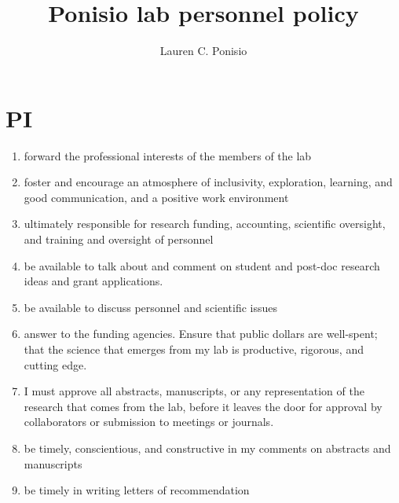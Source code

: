 \documentclass[12pt]{article}
\title{Ponisio lab personnel policy}
\author{Lauren C. Ponisio}
\begin{document}
\maketitle

\section{PI}
\begin{enumerate} 
\item forward the professional interests of the members of the lab
\item foster and encourage an atmosphere of inclusivity, exploration,
  learning, and good communication, and a positive work environment
\item ultimately responsible for research funding, accounting,
  scientific oversight, and training and oversight of personnel
\item be available to talk about and comment on student and post-doc
  research ideas and grant applications.
\item be available to discuss personnel and scientific issues 
\item answer to the funding agencies. Ensure that public dollars are
  well-spent; that the science that emerges from my lab is productive,
  rigorous, and cutting edge. 
\item I must approve all abstracts, manuscripts, or any representation
  of the research that comes from the lab, before it leaves the door
  for approval by collaborators or submission to meetings or journals.
\item be timely, conscientious, and constructive in my comments on
  abstracts and manuscripts
\item be timely in writing letters of recommendation
\end{enumerate}
\end{document}

